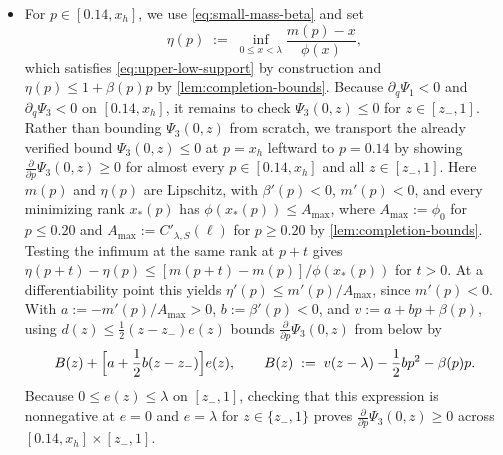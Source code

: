 \documentclass[11pt]{article}
\numberwithin{equation}{section}
\theoremstyle{plain}
\theoremstyle{definition}
\newcommand{\1}{\mathbf{1}}
\begin{document}
\begin{itemize}
  \begin{equation}
    \Psi_3(0, z) \;\le\; (z - \lambda)(1 + \beta p - \eta) - \frac{1}{2}\beta p^2 + \Bigl[\frac{1}{2}\beta(z - z_-) - \eta\Bigr]e(z).
    \label{eq:H-small-mass-bound}
  \end{equation}
  Since $\frac{1}{2}\beta(z - z_-) - \eta < 0$ and $e(z) \ge 0.26(z - 0.789)_+$ (\cref{prop:shape}), substitution of this lower bound for $e(z)$ gives an upper bound in \cref{eq:H-small-mass-bound} that is affine on $[z_-, 0.789]$ and convex on $[0.789, 1]$, and is negative at $z_-$, $0.789$, and $1$ (\cref{lem:completion-bounds}), while $\partial_q \Psi_1 < 0$ and $\partial_q \Psi_3 < 0$ reduce $q > 0$ to $q = 0$.
  \item For $p \in [0.14, x_h]$, we use \cref{eq:small-mass-beta} and set
  \[
    \eta(p) \;:=\; \inf_{0 \le x < \lambda}\frac{m(p) - x}{\phi(x)},
  \]
  which satisfies \cref{eq:upper-low-support} by construction and $\eta(p) \le 1 + \beta(p)p$ by \cref{lem:completion-bounds}. Because $\partial_q \Psi_1 < 0$ and $\partial_q \Psi_3 < 0$ on $[0.14, x_h]$, it remains to check $\Psi_3(0, z) \le 0$ for $z \in [z_-, 1]$. Rather than bounding $\Psi_3(0, z)$ from scratch, we transport the already verified bound $\Psi_3(0, z) \le 0$ at $p = x_h$ leftward to $p = 0.14$ by showing $\frac{\partial}{\partial p}\Psi_3(0, z) \ge 0$ for almost every $p \in [0.14, x_h]$ and all $z \in [z_-, 1]$. Here $m(p)$ and $\eta(p)$ are Lipschitz, with $\beta'(p) < 0$, $m'(p) < 0$, and every minimizing rank $x_*(p)$ has $\phi(x_*(p))\le A_{\max}$, where $A_{\max}:=\phi_0$ for $p\le0.20$ and $A_{\max}:=C'_{\lambda,S}(\ell)$ for $p\ge0.20$ by \cref{lem:completion-bounds}. Testing the infimum at the same rank at $p+t$ gives $\eta(p+t)-\eta(p)\le[m(p+t)-m(p)]/\phi(x_*(p))$ for $t>0$. At a differentiability point this yields $\eta'(p)\le m'(p)/A_{\max}$, since $m'(p)<0$. With $a := -m'(p)/A_{\max} > 0$, $b := \beta'(p) < 0$, and $v := a + b p + \beta(p)$, using $d(z) \le \frac{1}{2}(z - z_-)e(z)$ bounds $\frac{\partial}{\partial p}\Psi_3(0, z)$ from below by
  \[
    B(z) + \Bigl[a + \frac{1}{2}b(z - z_-)\Bigr]e(z),
    \qquad
    B(z) \;:=\; v(z - \lambda) - \frac{1}{2}b p^2 - \beta(p)p.
  \]
  Because $0 \le e(z) \le \lambda$ on $[z_-, 1]$, checking that this expression is nonnegative at $e = 0$ and $e = \lambda$ for $z \in \{z_-, 1\}$ proves $\frac{\partial}{\partial p}\Psi_3(0, z) \ge 0$ across $[0.14, x_h] \times [z_-, 1]$.
\end{itemize}
\end{document}
